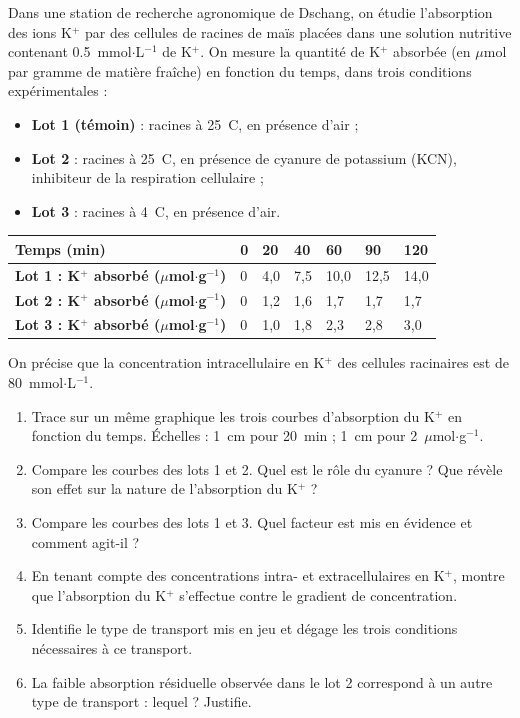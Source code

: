 \documentclass[11pt]{article}
\begin{document}
\begin{exercice}
Dans une station de recherche agronomique de Dschang, on étudie l'absorption des ions K$^+$ par des cellules de racines de maïs placées dans une solution nutritive contenant \num{0,5}~mmol$\cdot$L$^{-1}$ de K$^+$. On mesure la quantité de K$^+$ absorbée (en $\mu$mol par gramme de matière fraîche) en fonction du temps, dans trois conditions expérimentales :

\begin{itemize}
\item \textbf{Lot 1 (témoin)} : racines à 25~\textdegree C, en présence d'air ;
\item \textbf{Lot 2} : racines à 25~\textdegree C, en présence de cyanure de potassium (KCN), inhibiteur de la respiration cellulaire ;
\item \textbf{Lot 3} : racines à 4~\textdegree C, en présence d'air.
\end{itemize}

\begin{center}
\begin{tabularx}{\linewidth}{|l|*{6}{X|}}
\hline
\rowcolor{popblueL} \textbf{Temps (min)} & 0 & 20 & 40 & 60 & 90 & 120 \\
\hline
\textbf{Lot 1 : K$^+$ absorbé ($\mu$mol$\cdot$g$^{-1}$)} & 0 & 4,0 & 7,5 & 10,0 & 12,5 & 14,0 \\
\hline
\textbf{Lot 2 : K$^+$ absorbé ($\mu$mol$\cdot$g$^{-1}$)} & 0 & 1,2 & 1,6 & 1,7 & 1,7 & 1,7 \\
\hline
\textbf{Lot 3 : K$^+$ absorbé ($\mu$mol$\cdot$g$^{-1}$)} & 0 & 1,0 & 1,8 & 2,3 & 2,8 & 3,0 \\
\hline
\end{tabularx}
\end{center}

On précise que la concentration intracellulaire en K$^+$ des cellules racinaires est de \num{80}~mmol$\cdot$L$^{-1}$.

\begin{enumerate}
\item Trace sur un même graphique les trois courbes d'absorption du K$^+$ en fonction du temps. Échelles : 1~cm pour 20~min ; 1~cm pour 2~$\mu$mol$\cdot$g$^{-1}$.
\item Compare les courbes des lots 1 et 2. Quel est le rôle du cyanure ? Que révèle son effet sur la nature de l'absorption du K$^+$ ?
\item Compare les courbes des lots 1 et 3. Quel facteur est mis en évidence et comment agit-il ?
\item En tenant compte des concentrations intra- et extracellulaires en K$^+$, montre que l'absorption du K$^+$ s'effectue contre le gradient de concentration.
\item Identifie le type de transport mis en jeu et dégage les trois conditions nécessaires à ce transport.
\item La faible absorption résiduelle observée dans le lot 2 correspond à un autre type de transport : lequel ? Justifie.
\end{enumerate}
\end{exercice}
\end{document}
